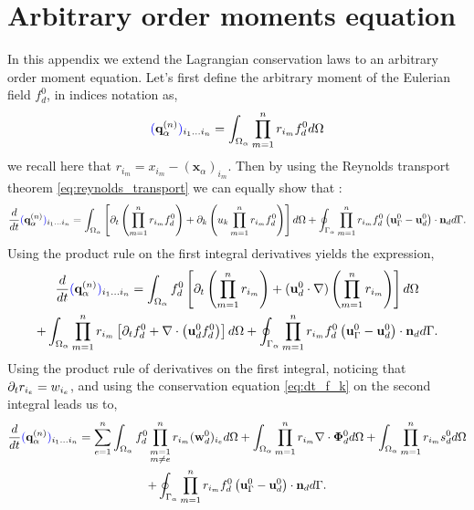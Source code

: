 \documentclass[11pt]{My_preprint}
\providecommand{\DIFadd}[1]{{\protect\color{blue}\uwave{#1}}} %
\providecommand{\DIFaddbegin}{} %
\providecommand{\DIFaddend}{} %
\providecommand{\DIFdelbegin}{} %
\providecommand{\DIFdelend}{} %
\begin{document}
 
\section{Arbitrary order moments equation}
\label{ap:Moments_equations}
In this appendix we extend the Lagrangian conservation laws to an arbitrary order moment equation. 
Let's first define the arbitrary moment of the Eulerian field $f_d^0$, in indices notation as, 
\begin{equation*}
    \DIFdelbegin %
\DIFdelend \DIFaddbegin \DIFadd{(}\DIFaddend \textbf{q}_\alpha^{(n)}\DIFdelbegin %
\DIFdelend \DIFaddbegin \DIFadd{)}\DIFaddend _{i_1\ldots i_n}
    = \intO{
    \pri{1}{n} f_d^0 
    }
\end{equation*}
we recall here that $r_{i_m} = x_{i_m} - (\textbf{x}_\alpha)_{i_m}$. 
Then by using the Reynolds transport theorem \ref{eq:reynolds_transport} we can equally show that :
\begin{equation}
    \ddt {\DIFdelbegin %
\DIFdelend \DIFaddbegin \DIFadd{(}\DIFaddend \textbf{q}_\alpha^{(n)}\DIFdelbegin %
\DIFdelend \DIFaddbegin \DIFadd{)}\DIFaddend _{i_1\ldots i_n}}
    =\intO{
        \left[ \partial_t \left(\pri{1}{n}f_d^0\right) 
    + \partial_k \left(u_k \pri{1}{n}f_d^0\right) \right]
    }
    +\intS{ \pri{1}{n} f_d^0 \left(\textbf{u}_\Gamma^0 - \textbf{u}_d^0\right)\cdot \textbf{n}_d }. 
\end{equation}
Using the product rule on the first integral derivatives yields the expression, 
\begin{multline*}
    \ddt {\DIFdelbegin %
\DIFdelend \DIFaddbegin \DIFadd{(}\DIFaddend \textbf{q}_\alpha^{(n)}\DIFdelbegin %
\DIFdelend \DIFaddbegin \DIFadd{)}\DIFaddend _{i_1\ldots i_n}}
    =\intO{ 
        f_d^0 \left[ \partial_t \left(\pri{1}{n}\right) 
        + (\textbf{u}_d^0\cdot \grad) \left( \pri{1}{n}\right) \right]
    }\\
    +\intO{ 
        \pri{1}{n} 
        \left[ \partial_t f_d^0
    +  \div \left(\textbf{u}_d^0 f_d^0 \right) \right]
    }
    +\intS{ \pri{1}{n} f_d^0 \left(\textbf{u}_\Gamma^0 - \textbf{u}_d^0\right)\cdot \textbf{n}_d }. 
\end{multline*}
Using the product rule of derivatives on the first integral, noticing that $\partial_t r_{i_e} = w_{i_e}$, and using the conservation equation \ref{eq:dt_f_k} on the second integral leads us to, 
\begin{multline*}
    \ddt {\DIFdelbegin %
\DIFdelend \DIFaddbegin \DIFadd{(}\DIFaddend \textbf{q}_\alpha^{(n)}\DIFdelbegin %
\DIFdelend \DIFaddbegin \DIFadd{)}\DIFaddend _{i_1\ldots i_n}}
    = \sum_{e=1}^{n} \intO{ 
        f_d^0 \prod^{n}_{\substack{ m=1 \\   m \neq e}} r_{i_m} (\textbf{w}_d^0)_{i_e}
        }
    +\intO{\pri{1}{n} \div\bm{\Phi}_d^0}
    + \intO{ \pri{1}{n} s_d^0}\\
    +\intS{ \pri{1}{n} f_d^0 \left(\textbf{u}_\Gamma^0 - \textbf{u}_d^0\right)\cdot \textbf{n}_d }.
\end{multline*}
\end{document}
